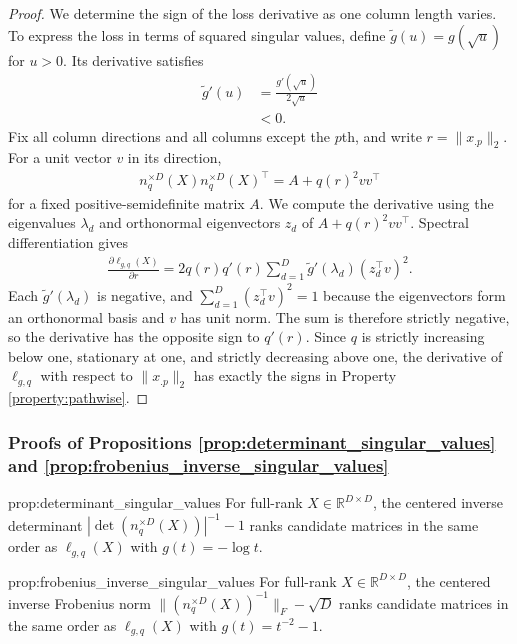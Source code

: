 \begin{proof}
We determine the sign of the loss derivative as one column length varies.
To express the loss in terms of squared singular values, define $\widetilde g(u)=g(\sqrt u)$ for $u>0$.
Its derivative satisfies
\begin{align}
\widetilde g'(u)&=\frac{g'(\sqrt u)}{2\sqrt u} \\
&<0.
\end{align}
Fix all column directions and all columns except the $p$th, and write $r=\|x_{.p}\|_2$.
For a unit vector $v$ in its direction,
\begin{align}
n_q^{\times D}(X)n_q^{\times D}(X)^\top=A+q(r)^2vv^\top
\end{align}
for a fixed positive-semidefinite matrix $A$.
We compute the derivative using the eigenvalues $\lambda_d$ and orthonormal eigenvectors $z_d$ of $A+q(r)^2vv^\top$.
Spectral differentiation gives
\begin{align}
\frac{\partial\ell_{g,q}(X)}{\partial r}
=2q(r)q'(r)\sum_{d=1}^D\widetilde g'(\lambda_d)(z_d^\top v)^2.
\end{align}
Each $\widetilde g'(\lambda_d)$ is negative, and $\sum_{d=1}^D(z_d^\top v)^2=1$ because the eigenvectors form an orthonormal basis and $v$ has unit norm.
The sum is therefore strictly negative, so the derivative has the opposite sign to $q'(r)$.
Since $q$ is strictly increasing below one, stationary at one, and strictly decreasing above one, the derivative of $\ell_{g,q}$ with respect to $\|x_{.p}\|_2$ has exactly the signs in Property \ref{property:pathwise}.


\end{proof}

\subsubsection{Proofs of Propositions
\ref{prop:determinant_singular_values} and \ref{prop:frobenius_inverse_singular_values}}

\begin{restatedproposition}{prop:determinant_singular_values}
For full-rank $X\in\mathbb R^{D\times D}$, the centered inverse determinant $|\det(n_q^{\times D}(X))|^{-1}-1$ ranks candidate matrices in the same order as $\ell_{g,q}(X)$ with $g(t)=-\log t$.
\end{restatedproposition}

\begin{restatedproposition}{prop:frobenius_inverse_singular_values}
For full-rank $X\in\mathbb R^{D\times D}$, the centered inverse Frobenius norm $\|(n_q^{\times D}(X))^{-1}\|_F-\sqrt D$ ranks candidate matrices in the same order as $\ell_{g,q}(X)$ with $g(t)=t^{-2}-1$.
\end{restatedproposition}

